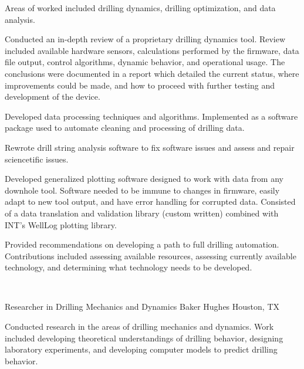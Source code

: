 \documentclass{leresume}
\begin{document}
					\noindent Areas of worked included drilling dynamics, drilling optimization, and data analysis.
		\begin{bulletedlist}
			
		\item
					Conducted an in-depth review of a proprietary drilling dynamics tool.  Review included available hardware sensors, calculations performed by the firmware, data file output, control algorithms, dynamic behavior, and operational usage.  The conclusions were documented in a report which detailed the current status, where improvements could be made, and how to proceed with further testing and development of the device.
				
		\item
					Developed data processing techniques and algorithms.  Implemented as a software package used to automate cleaning and processing of drilling data.
				
		\item
					Rewrote drill string analysis software to fix software issues and assess and repair sciencetific issues.
				
		\item
					Developed generalized plotting software designed to work with data from any downhole tool.  Software needed to be immune to changes in firmware, easily adapt to new tool output, and have error handling for corrupted data.  Consisted of a data translation and validation library (custom written) combined with INT's WellLog plotting library.
				
		\item
					Provided recommendations on developing a path to full drilling automation.  Contributions included assessing available resources, assessing currently available technology, and determining what technology needs to be developed.
				
		\end{bulletedlist}
			\vspace*{-12pt}
	\hspace*{0pt}\\ \vspace*{-2pt}
				
            {Researcher in Drilling Mechanics and Dynamics}
            {Baker Hughes}
			{Houston, TX}
			
					\noindent
				Conducted research in the areas of drilling mechanics and dynamics.  Work included developing theoretical understandings of drilling behavior, designing laboratory experiments, and developing computer models to predict drilling behavior.
			
\end{document}
